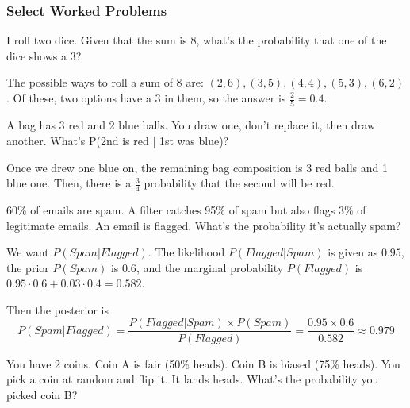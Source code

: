 \subsubsection{Select Worked Problems}

\begin{problem}
I roll two dice. Given that the sum is 8, what's the probability that one of the dice shows a 3?
\end{problem}

\begin{solution}
The possible ways to roll a sum of 8 are: $(2, 6), (3, 5), (4, 4), (5, 3), (6, 2)$. Of these, two options have a 3 in them, so the answer is $\frac{2}{5} = 0.4$.
\end{solution}

\begin{problem}
A bag has 3 red and 2 blue balls. You draw one, don't replace it, then draw another. What's P(2nd is red | 1st was blue)?
\end{problem}

\begin{solution}
Once we drew one blue on, the remaining bag composition is 3 red balls and 1 blue one. Then, there is a $\frac{3}{4}$ probability that the second will be red.
\end{solution}


\begin{problem}
60\% of emails are spam. A filter catches 95\% of spam but also flags 3\% of legitimate emails. An email is flagged. What's the probability it's actually spam?
\end{problem}

\begin{solution}
We want $P(Spam | Flagged)$. The likelihood $P(Flagged | Spam)$ is given as $0.95$, the prior $P(Spam)$ is $0.6$, and the marginal probability $P(Flagged)$ is $0.95 \cdot 0.6 + 0.03 \cdot 0.4 = 0.582$.

Then the posterior is
\[
P(Spam | Flagged) = \frac{P(Flagged | Spam) \times P(Spam)}{P(Flagged)} = \frac{0.95 \times 0.6}{0.582} \approx 0.979
\]


\end{solution}


\begin{problem}
You have 2 coins. Coin A is fair (50\% heads). Coin B is biased (75\% heads). You pick a coin at random and flip it. It lands heads. What's the probability you picked coin B?
\end{problem}

